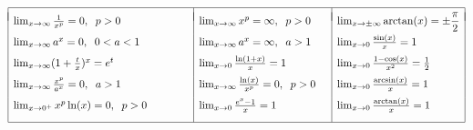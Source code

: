 \documentclass{article}
\begin{document}
\def\EndRow{\\*[6pt]}
$\begin{array}{|ll|ll|l|}\hline& &&&\\*[-8pt]
  \lim_{x\rightarrow\infty}\frac{1}{x^p}=0, \hspace{2 mm} p>0 & &\lim_{x\rightarrow\infty}x^p=\infty,\hspace{2 mm} p>0&& \lim_{x\to\pm\infty}\arctan(x)=\pm\dfrac{\pi}{2}
\EndRow
  \lim_{x\rightarrow\infty}a^x=0,\hspace{2 mm} 0<a<1 & &\lim_{x\rightarrow\infty}a^x=\infty, \hspace{2 mm}a>1 &&\lim_{x\to0}\frac{\sin(x)}x=1
\EndRow
\lim_{x\rightarrow\infty}(1+\frac{t}{x})^x=e^t & &\lim_{x\rightarrow 0}\frac{\ln(1+x)}{x}=1 &&\lim_{x\rightarrow 0}\frac{1-\cos(x)}{x^2}=\frac12
\EndRow \lim_{x\rightarrow \infty}\frac{x^p}{a^x}=0, \hspace{2 mm} a>1 & &\lim_{x\rightarrow\infty}\frac{\ln(x)}{x^p}=0, \hspace{2 mm}p>0&&\lim_{x\rightarrow 0}\frac{\arcsin(x)}{x}=1
\EndRow
\lim_{x\rightarrow0^+}x^p\ln(x)=0, \hspace{2 mm}p>0 \hspace{10 mm}& & \lim_{x\rightarrow 0}\frac{e^x-1}{x}=1 && \lim_{x\rightarrow 0}\frac{\arctan(x)}{x}=1
\\*[9pt]\hline
\end{array}$
\end{document}
